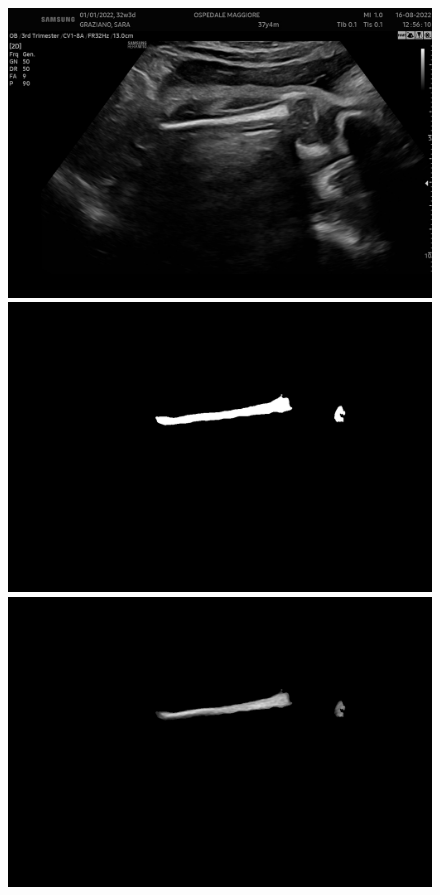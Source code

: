 \begin{figure}[!ht]
	\centering
	\begin{minipage}{0.32\textwidth}
		\centering
		\includegraphics[width=\textwidth]{./Immagini/nuovo_ecografo_results/3_image.png}
	\end{minipage}
	\hfill %
	\begin{minipage}{0.32\textwidth}
		\centering
		\includegraphics[width=\textwidth]{./Immagini/nuovo_ecografo_results/3_mask.png}
	\end{minipage}
	\hfill %
	\begin{minipage}{0.32\textwidth}
		\centering
		\includegraphics[width=\textwidth]{./Immagini/nuovo_ecografo_results/3_extracted_femur.png}

\end{minipage}
\end{figure}
